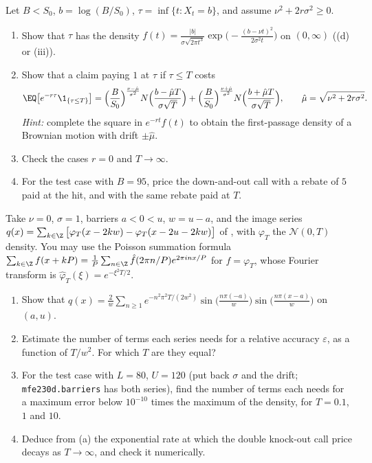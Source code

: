 \begin{exercise}\label{ex:bar-one-touch}
\medium Let $B<S_0$, $b=\log(B/S_0)$, $\tau=\inf\{t:X_t=b\}$, and assume $\nu^2+2r\sigma^2\ge0$.
\begin{enumerate}[label=(\alph*)]
  \item Show that $\tau$ has the density $f(t)=\frac{|b|}{\sigma\sqrt{2\pi t^3}}\exp\big(-\frac{(b-\nu t)^2}{2\sigma^2t}\big)$
    on $(0,\infty)$ ((d) or (iii)).
  \item Show that a claim paying $1$ at $\tau$ if $\tau\le T$ costs
    \[
      \EQ\big[e^{-r\tau}\1_{\{\tau\le T\}}\big]=\Big(\frac B{S_0}\Big)^{\frac{\nu-\hat\mu}{\sigma^2}}N\Big(\frac{b-\hat\mu T}{\sigma\sqrt T}\Big)
      +\Big(\frac B{S_0}\Big)^{\frac{\nu+\hat\mu}{\sigma^2}}N\Big(\frac{b+\hat\mu T}{\sigma\sqrt T}\Big),\qquad
      \hat\mu=\sqrt{\nu^2+2r\sigma^2}.
    \]
    \emph{Hint:} complete the square in $e^{-rt}f(t)$ to obtain the first-passage density of a
    Brownian motion with drift $\pm\hat\mu$.
  \item Check the cases $r=0$ and $T\to\infty$.
  \item For the test case with $B=95$, price the down-and-out call with a rebate of $5$ paid at
    the hit, and with the same rebate paid at $T$.
\end{enumerate}
\end{exercise}

\begin{exercise}\label{ex:bar-sine}
\hard Take $\nu=0$, $\sigma=1$, barriers $a<0<u$, $w=u-a$, and the image series
$q(x)=\sum_{k\in\Z}\big[\varphi_T(x-2kw)-\varphi_T(x-2u-2kw)\big]$ of , with $\varphi_T$
the $\mathcal N(0,T)$ density. You may use the Poisson summation formula
$\sum_{k\in\Z}f(x+kP)=\frac1P\sum_{n\in\Z}\hat f(2\pi n/P)e^{2\pi inx/P}$ for $f=\varphi_T$, whose Fourier
transform is $\hat\varphi_T(\xi)=e^{-\xi^2T/2}$.
\begin{enumerate}[label=(\alph*)]
  \item Show that
    $q(x)=\frac2w\sum_{n\ge1}e^{-n^2\pi^2T/(2w^2)}\sin\big(\frac{n\pi(-a)}w\big)\sin\big(\frac{n\pi(x-a)}w\big)$ on $(a,u)$.
  \item Estimate the number of terms each series needs for a relative accuracy $\varepsilon$, as a
    function of $T/w^2$. For which $T$ are they equal?
  \item For the test case with $L=80$, $U=120$ (put back $\sigma$ and the drift; \texttt{mfe230d.barriers} has both
    series), find the number of terms each needs for a maximum error below $10^{-10}$ times the
    maximum of the density, for $T=0.1$, $1$ and $10$.
  \item Deduce from (a) the exponential rate at which the double knock-out call price decays as
    $T\to\infty$, and check it numerically.
\end{enumerate}
\end{exercise}

